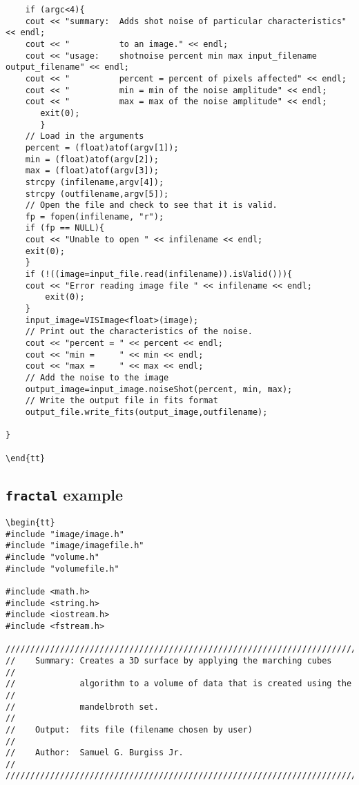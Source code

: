 \begin{appendix}
\begin{verbatim}
    if (argc<4){
	cout << "summary:  Adds shot noise of particular characteristics" << endl;
	cout << "          to an image." << endl;
	cout << "usage:    shotnoise percent min max input_filename output_filename" << endl;
	cout << "          percent = percent of pixels affected" << endl;
	cout << "          min = min of the noise amplitude" << endl;
	cout << "          max = max of the noise amplitude" << endl;
       exit(0);
       }
    // Load in the arguments
    percent = (float)atof(argv[1]);
    min = (float)atof(argv[2]);
    max = (float)atof(argv[3]);
    strcpy (infilename,argv[4]);
    strcpy (outfilename,argv[5]);
    // Open the file and check to see that it is valid.
    fp = fopen(infilename, "r");
    if (fp == NULL){
	cout << "Unable to open " << infilename << endl;
   	exit(0);
    }
    if (!((image=input_file.read(infilename)).isValid())){
	cout << "Error reading image file " << infilename << endl;
        exit(0);
    }
    input_image=VISImage<float>(image);
    // Print out the characteristics of the noise.
    cout << "percent = " << percent << endl;
    cout << "min =     " << min << endl;
    cout << "max =     " << max << endl;
    // Add the noise to the image
    output_image=input_image.noiseShot(percent, min, max);
    // Write the output file in fits format
    output_file.write_fits(output_image,outfilename);

}

\end{tt}
\end{verbatim}

\subsection{{\tt fractal} example}
\begin{verbatim}
\begin{tt}
#include "image/image.h"
#include "image/imagefile.h"
#include "volume.h"
#include "volumefile.h"

#include <math.h>
#include <string.h>
#include <iostream.h>
#include <fstream.h>

/////////////////////////////////////////////////////////////////////////
//    Summary: Creates a 3D surface by applying the marching cubes     //
//             algorithm to a volume of data that is created using the //
//             mandelbroth set.                                        //
//    Output:  fits file (filename chosen by user)                     //
//    Author:  Samuel G. Burgiss Jr.                                   //
/////////////////////////////////////////////////////////////////////////


\end{verbatim}
\end{appendix}
